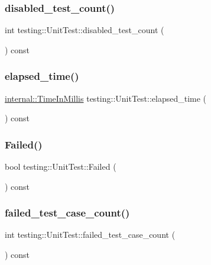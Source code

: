 \subsubsection{\texorpdfstring{disabled\_test\_count()}{disabled\_test\_count()}}
{\footnotesize\ttfamily int testing\+::\+Unit\+Test\+::disabled\+\_\+test\+\_\+count (\begin{DoxyParamCaption}{ }\end{DoxyParamCaption}) const}

\mbox{\label{classtesting_1_1UnitTest_acf608411a17cb3b40a1e9d724f262b3b}} 
\subsubsection{\texorpdfstring{elapsed\_time()}{elapsed\_time()}}
{\footnotesize\ttfamily \mbox{\hyperlink{namespacetesting_1_1internal_a66a845df404b38fe85c5e14a069f255a}{internal\+::\+Time\+In\+Millis}} testing\+::\+Unit\+Test\+::elapsed\+\_\+time (\begin{DoxyParamCaption}{ }\end{DoxyParamCaption}) const}

\mbox{\label{classtesting_1_1UnitTest_a706f29e765916616b11a271a65948727}} 
\subsubsection{\texorpdfstring{Failed()}{Failed()}}
{\footnotesize\ttfamily bool testing\+::\+Unit\+Test\+::\+Failed (\begin{DoxyParamCaption}{ }\end{DoxyParamCaption}) const}

\mbox{\label{classtesting_1_1UnitTest_abc0fa297a4103f7cdd9627ae27d9d0ef}} 
\subsubsection{\texorpdfstring{failed\_test\_case\_count()}{failed\_test\_case\_count()}}
{\footnotesize\ttfamily int testing\+::\+Unit\+Test\+::failed\+\_\+test\+\_\+case\+\_\+count (\begin{DoxyParamCaption}{ }\end{DoxyParamCaption}) const}

